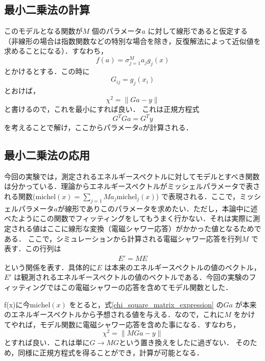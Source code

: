 \subsection{最小二乗法の計算}
このモデルとなる関数が$M$ 個のパラメータ$a$ に対して線形であると仮定する （非線形の場合は指数関数などの特別な場合を除き，反復解法によって近似値を求めることになる）．すなわち，
\begin{equation}
f(a) = \sigma_{j=1}^M a_j g_j(x)
\end{equation}
とかけるとする．この時に
\begin{equation}
G_{ij} = g_j(x_i)
\end{equation}
とおけば，
\begin{equation}
\chi^2 = \| Ga - y \|
\label{chi_square_matrix_expression}
\end{equation}
と書けるので，これを最小にすれば良い．
これは正規方程式
\begin{equation}
G^TGa=G^Ty
\end{equation}
を考えることで解け，ここからパラメータ$a$が計算される．

\subsection{最小二乗法の応用}
今回の実験では，測定されるエネルギースペクトルに対してモデルとすべき関数は分かっている．理論からエネルギースペクトルがミッシェルパラメータで表される関数($\mathrm{michel}(x) = \sum_{j=1}{M}a_j \mathrm{michel}_j(x)$) で表現される．ここで，ミッシェルパラメータ$a$が線形でありこのパラメータを求めたい．ただし，本論中に述べたようにこの関数でフィッティングをしてもうまく行かない．それは実際に測定される値はここに線形な変換（電磁シャワー応答）がかかった値となるためである．
ここで，シミュレーションから計算される電磁シャワー応答を行列$M$ で表す．この行列は
\begin{eqnarray}
E' = ME
\end{eqnarray}
という関係を表す．具体的に$E$ は本来のエネルギースペクトルの値のベクトル，$E'$ は観測されるエネルギースペクトルの値のベクトルである．今回の実験のフィッティングではこの電磁シャワーの応答を含めてモデル関数とした．

f(x)に今$\mathrm{michel}(x)$ をとると，式\eqref{chi_square_matrix_expression} の$Ga$ が本来のエネルギースペクトルから予想される値を与える．なので，これに$M$ をかけてやれば，モデル関数に電磁シャワー応答を含めた事になる．すなわち，
\begin{equation}
\chi^2 = \| MGa - y \|
\end{equation}
とすれば良い．これは単に$G\rightarrow MG$という置き換えをしたに過ぎない．
そのため，同様に正規方程式を得ることができ，計算が可能となる．
